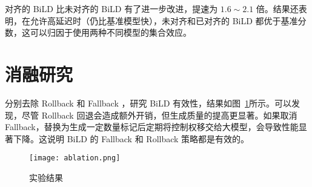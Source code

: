 对齐的 BiLD 比未对齐的 BiLD 有了进一步改进，提速为 $1.6\sim 2.1$ 倍。结果还表明，在允许高延迟时（仍比基准模型快），未对齐和已对齐的 BiLD 都优于基准分数，这可以归因于使用两种不同模型的集合效应。

\section{消融研究}

分别去除 Rollback 和 Fallback ，研究 BiLD 有效性，结果如图~\ref{ablation}所示。可以发现，尽管 Rollback 回退会造成额外开销，但生成质量的提高更显著。如果取消 Fallback，替换为生成一定数量标记后定期将控制权移交给大模型，会导致性能显著下降。这说明 BiLD 的 Fallback 和 Rollback 策略都是有效的。

\begin{figure}[htbp]
    \centering
    \texttt{[image: ablation.png]}
    \caption{实验结果}
    \label{ablation}
\end{figure}
